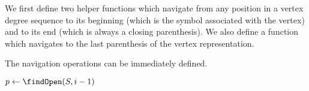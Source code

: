 \bigbreak

We first define two helper functions which navigate from any position in a vertex degree sequence to its beginning (which is the symbol associated with the vertex) and to its end (which is always a closing parenthesis).
We also define a function which navigates to the last parenthesis of the vertex representation.

\begin{algorithm}
\begin{algorithmic}
		\State {} 
		\State {} 
	\Else
		\State {}
	\EndIf
\EndFunction
\end{algorithmic}
\end{algorithm}

\begin{algorithm}
\begin{algorithmic}
		\State {}
	\Else
		\State {}
	\EndIf
\EndFunction
\end{algorithmic}
\end{algorithm}

\begin{algorithm}
\begin{algorithmic}
		\State {}
	\Else
		\State {}
	\EndIf
\EndFunction
\end{algorithmic}
\end{algorithm}

The navigation operations can be immediately defined.

\begin{algorithm}
\begin{algorithmic}
	\State $p \gets \findOpen(S, i - 1)$ 
	\State {}
\EndFunction
\end{algorithmic}
\end{algorithm}

\begin{algorithm}
\begin{algorithmic}
	\State {}
\EndFunction
\end{algorithmic}
\end{algorithm}

